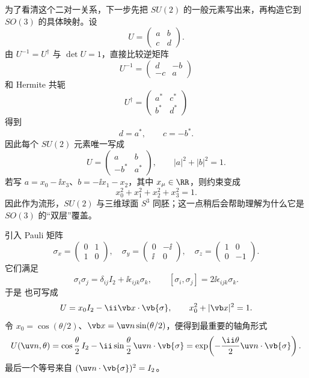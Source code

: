 为了看清这个二对一关系，下一步先把 $SU(2)$ 的一般元素写出来，再构造它到 $SO(3)$ 的具体映射。设
\[
U=\begin{pmatrix}a&b\\c&d\end{pmatrix}.
\]
由 $U^{-1}=U^\dagger$ 与 $\det U=1$，直接比较逆矩阵
\[
U^{-1}=\begin{pmatrix}d&-b\\-c&a\end{pmatrix}
\]
和 Hermite 共轭
\[
U^\dagger=\begin{pmatrix}a^*&c^*\\b^*&d^*\end{pmatrix}
\]
得到
\[
d=a^*,\qquad c=-b^*.
\]
因此每个 $SU(2)$ 元素唯一写成
\begin{equation}
U=\begin{pmatrix}
a&b\\-b^*&a^*
\end{pmatrix},
\qquad |a|^2+|b|^2=1.
\label{eq:su2-general}
\end{equation}
若写 $a=x_0-\ii x_3$、$b=-\ii x_1-x_2$，其中 $x_\mu\in\RR$，则约束变成
\[
x_0^2+x_1^2+x_2^2+x_3^2=1.
\]
因此作为流形，$SU(2)$ 与三维球面 $S^3$ 同胚；这一点稍后会帮助理解为什么它是 $SO(3)$ 的“双层”覆盖。

引入 Pauli 矩阵
\[
\sigma_x=\begin{pmatrix}0&1\\1&0\end{pmatrix},\quad
\sigma_y=\begin{pmatrix}0&-\ii\\\ii&0\end{pmatrix},\quad
\sigma_z=\begin{pmatrix}1&0\\0&-1\end{pmatrix}.
\]
它们满足
\begin{equation}
\sigma_i\sigma_j
=\delta_{ij}I_2+\ii\epsilon_{ijk}\sigma_k,
\qquad
[\sigma_i,\sigma_j]=2\ii\epsilon_{ijk}\sigma_k.
\label{eq:pauli-product}
\end{equation}
于是  也可写成
\[
U=x_0I_2-\ii\vb x\cdot\vb{\sigma},
\qquad x_0^2+\lvert\vb x\rvert^2=1.
\]
令 $x_0=\cos(\theta/2)$、$\vb x=\uv n\sin(\theta/2)$，便得到最重要的轴角形式
\begin{equation}
U(\uv n,\theta)
=\cos\frac\theta2\,I_2
-\ii\sin\frac\theta2\,\uv n\cdot\vb{\sigma}
=\exp\!\left(-\frac{\ii\theta}{2}\uv n\cdot\vb{\sigma}\right).
\label{eq:su2-axis-angle}
\end{equation}
最后一个等号来自 $(\uv n\cdot\vb{\sigma})^2=I_2$。


